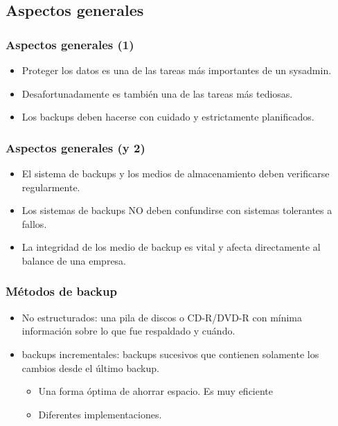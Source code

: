\documentclass{beamer}
\begin{document}
\subsection{Aspectos generales}

\begin{frame}
  \frametitle{Aspectos generales (1)}
  \begin{itemize}
    \item Proteger los datos es una de las tareas más importantes de un sysadmin.
    \item Desafortunadamente es también una de las tareas más tediosas.

    \item Los backups deben hacerse con cuidado y estrictamente planificados.
  \end{itemize}
\end{frame}

\begin{frame}
  \frametitle{Aspectos generales (y 2)}
  \begin{itemize}
    \item El sistema de backups y los medios de almacenamiento deben verificarse regularmente.
    \item Los sistemas de backups NO deben confundirse con sistemas tolerantes a fallos.
    \item La integridad de los medio de backup es vital y afecta directamente al balance de una empresa. 
  \end{itemize}
\end{frame}


\begin{frame}
  \frametitle{Métodos de backup}
  \begin{itemize}
    \item \alert{No estructurados:} una pila de discos o CD-R/DVD-R con mínima información sobre lo que fue respaldado y cuándo. 
    \item \alert{backups incrementales:} backups sucesivos que contienen solamente los cambios desde el último backup.
	  \begin{itemize}
		\item Una forma óptima de ahorrar espacio. Es muy eficiente
		\item Diferentes implementaciones.
	  \end{itemize}
  \end{itemize}
\end{frame}
\end{document}
